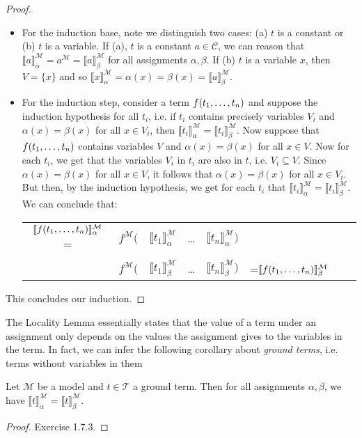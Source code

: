 \begin{enumerate}[\thesection.1]
\begin{proof}
		\begin{itemize}
		
		\item For the induction base, note we distinguish two cases: (a) $t$ is a constant or (b) $t$ is a variable. If (a), $t$ is a constant $a\in\mathcal{C}$, we can reason that $\llbracket a\rrbracket^\mathcal{M}_\alpha=a^\mathcal{M}=\llbracket a\rrbracket^\mathcal{M}_\beta$ for all assignments $\alpha,\beta$. If (b) $t$ is a variable $x$, then $V=\{x\}$ and so $\llbracket x\rrbracket^\mathcal{M}_\alpha=\alpha(x)=\beta(x)=\llbracket a\rrbracket^\mathcal{M}_\beta$. 
		
		\item For the induction step, consider a term $f(t_1, \mathellipsis, t_n)$ and suppose the induction hypothesis for all $t_i$, i.e. if $t_i$ contains precisely variables $V_i$ and $\alpha(x)=\beta(x)$ for all $x\in V_i$, then $\llbracket t_i\rrbracket_\alpha^\mathcal{M}=\llbracket t_i\rrbracket_\beta^\mathcal{M}$. Now suppose that $f(t_1, \mathellipsis, t_n)$ contains variables $V$ and $\alpha(x)=\beta(x)$ for all $x\in V$. Now for each $t_i$, we get that the variables $V_i$ in $t_i$ are also in $t$, i.e. $V_i\subseteq V$. Since $\alpha(x)=\beta(x)$ for all $x\in V$, it follows that $\alpha(x)=\beta(x)$ for all $x\in V_i$. But then, by the induction hypothesis, we get for each $t_i$ that $\llbracket t_i\rrbracket_\alpha^\mathcal{M}=\llbracket t_i\rrbracket_\beta^\mathcal{M}$. We can conclude that:
	\begin{center}
		\begin{tabular}{c c c c c c ll}
		$\llbracket f(t_1, \mathellipsis, t_n)\rrbracket^\mathcal{M}_\alpha$ = & $f^\mathcal{M}($ & $\llbracket t_1\rrbracket^\mathcal{M}_\alpha$ &  \dots & $\llbracket t_n\rrbracket^\mathcal{M}_\alpha)$\\
		 & & \rotatebox{90}{=} & & \rotatebox{90}{=} &\\
		& $f^\mathcal{M}($ & $\llbracket t_1\rrbracket^\mathcal{M}_\beta$ &  \dots & $\llbracket t_n\rrbracket^\mathcal{M}_\beta)$&=$\llbracket f(t_1, \mathellipsis, t_n)\rrbracket^\mathcal{M}_\beta$ \\
		\end{tabular}
		\end{center}
		
	\end{itemize}
This concludes our induction.				
		
	\end{proof}
	The Locality Lemma essentially states that the value of a term under an assignment only depends on the values the assignment gives to the variables in the term. In fact, we can infer the following corollary about \emph{ground terms}, i.e. terms without variables in them
		\begin{corollary}
		Let $\mathcal{M}$ be a model and $t\in\mathcal{T}$ a ground term. Then for all assignments $\alpha,\beta$, we have $\llbracket t\rrbracket_\alpha^\mathcal{M}=\llbracket t\rrbracket_\beta^\mathcal{M}$.
		\end{corollary}
		\begin{proof}
		Exercise 1.7.3.
		\end{proof}
	

\end{enumerate}
